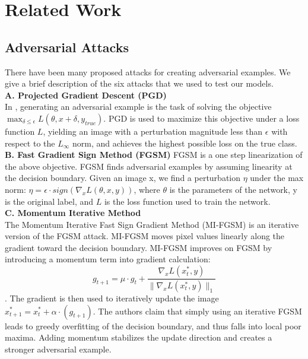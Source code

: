 \documentclass{article} %
\begin{document}
\section{Related Work}
\subsection{Adversarial Attacks}
There have been many proposed attacks for creating adversarial examples. We give a brief description of the six attacks that we used to test our models. \\

\noindent \textbf{A. Projected Gradient Descent (PGD)}\\
In \citep{lyu2015unified,madry2017towards}, generating an adversarial example is the task of solving the objective $\max_{\delta\leq\epsilon} L(\theta, x + \delta, y_{true})$. 
PGD is used to maximize this objective under a loss function $L$, yielding an image with a perturbation magnitude less than $\epsilon$ with respect to the $L_\infty$ norm, and achieves the highest possible loss on the true class. \\

\noindent \textbf{B. Fast Gradient Sign Method (FGSM)}
FGSM \citep{goodfellow2015explaining} is a one step linearization of the above objective. FGSM finds adversarial examples by assuming linearity at the decision boundary. Given an image x, we find a perturbation $\eta$ under the max norm: $\eta = \epsilon \cdot sign(\nabla_x L(\theta, x, y))$, where $\theta$ is the parameters of the network, y is the original label, and $L$ is the loss function used to train the network.
\\

\noindent \textbf{C. Momentum Iterative Method}\\
The Momentum Iterative Fast Sign Gradient Method (MI-FGSM) \citep{dong2018boosting} is an iterative version of the FGSM attack. MI-FGSM moves pixel values linearly along the gradient toward the decision boundary. MI-FGSM improves on FGSM by introducing a momentum term into gradient calculation: 
\[
g_{t+1} = \mu \cdot g_t + \frac{\nabla_x L(x^*_t, y)}{\|\nabla_x L(x^*_t, y)\|_1}
\]. 
The gradient is then used to iteratively update the image $x^*_{t+1} = x^*_t + \alpha \cdot (g_{t+1})$. The authors claim that simply using an iterative FGSM leads to greedy overfitting of the decision boundary, and thus falls into local poor maxima. Adding momentum stabilizes the update direction and creates a stronger adversarial example. 
\\
\end{document}

